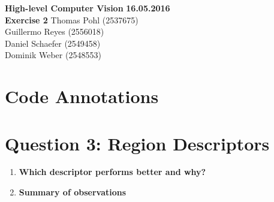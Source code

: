 \documentclass[12pt]{article}
\begin{document}

\noindent
{\Large \textbf{High-level Computer Vision}} \hfill \textbf{16.05.2016}\\
{\Large \textbf{Exercise 2}} \hfill Thomas Pohl (2537675)\\
\raggedleft \hfill Guillermo Reyes (2556018)\\
\hfill Daniel Schaefer (2549458)\\
\hfill Dominik Weber (2548553)\\

\raggedright


\section*{Code Annotations}




\section*{Question 3: Region Descriptors}

\begin{enumerate}[1.]
	\item 	
	\textbf{Which descriptor performs better and why?}\\
	
	\item
	\textbf{Summary of observations}\\
\end{enumerate}
\end{document}
